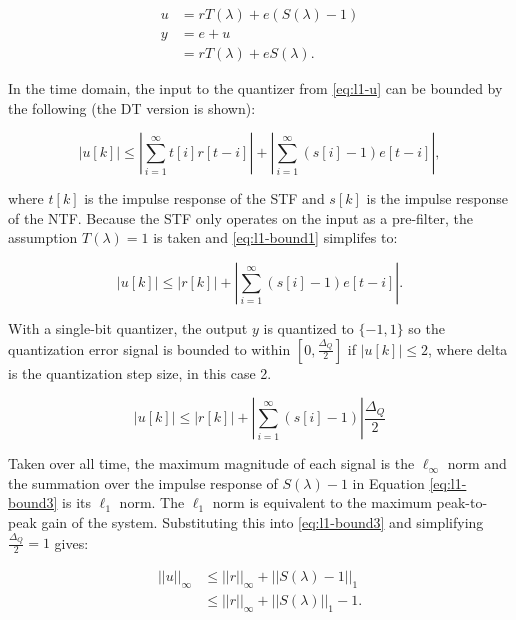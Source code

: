\begin{align}
	u &= rT(\lambda) + e\left(S(\lambda) - 1\right) \label{eq:l1-u} \\
	y &= e + u \nonumber \\
	&= rT(\lambda) + eS(\lambda). \nonumber
\end{align}

In the time domain, the input to the quantizer from \autoref{eq:l1-u} can be bounded by the following (the \gls{DT} version is shown):

\begin{equation}
	\left|u[k]\right| \leq \left|\sum_{i=1}^{\infty} t[i]r[t - i]\right| + \left|\sum_{i=1}^{\infty} \left(s[i] - 1\right)e[t - i]\right|, \label{eq:l1-bound1}
\end{equation}

where $t[k]$ is the impulse response of the \gls{STF} and $s[k]$ is the impulse response of the \gls{NTF}. Because the \gls{STF} only operates on the input as a pre-filter, the assumption $T(\lambda) = 1$ is taken and \autoref{eq:l1-bound1} simplifes to:

\begin{equation}
	\left|u[k]\right| \leq |r[k]| + \left|\sum_{i=1}^{\infty} \left(s[i] - 1\right)e[t - i]\right|. \label{eq:l1-bound2}
\end{equation}

With a single-bit quantizer, the output $y$ is quantized to $\{-1, 1\}$ so the quantization error signal is bounded to within $[0, \frac{\Delta_Q}{2}]$ if $|u[k]| \leq 2$, where \gls{delta} is the quantization step size, in this case 2.

\begin{equation} 
	\left|u[k]\right| \leq |r[k]| + \left|\sum_{i=1}^{\infty} \left(s[i] - 1\right)\right|\frac{\Delta_Q}{2} \label{eq:l1-bound3}
\end{equation}

Taken over all time, the maximum magnitude of each signal is the $\ell_\infty$ norm and the summation over the impulse response of $S(\lambda) - 1$ in Equation \ref{eq:l1-bound3} is its $\ell_1$ norm. The $\ell_1$ norm is equivalent to the maximum peak-to-peak gain of the system. Substituting this into \autoref{eq:l1-bound3} and simplifying $\frac{\Delta_Q}{2} = 1$ gives:

\begin{align*}
	||u||_\infty &\leq ||r||_\infty + ||S(\lambda) - 1||_1 \\
	&\leq ||r||_\infty + ||S(\lambda)||_1 - 1	.
\end{align*}

